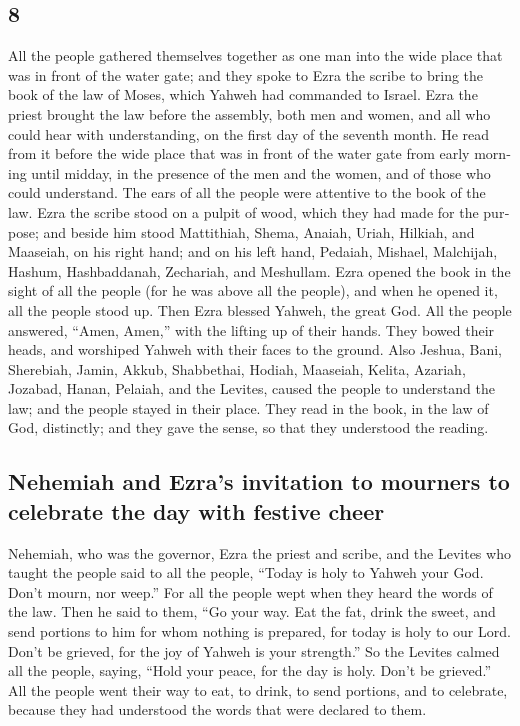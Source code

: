 \begin{paracol}{2}
\begin{otherlanguage}{english}
\hypertarget{section-15}{%
\section{8}\label{section-15}}

 All the people gathered themselves together as one man
into the wide place that was in front of the water gate; and they spoke
to Ezra the scribe to bring the book of the law of Moses, which Yahweh
had commanded to Israel.  Ezra the priest brought the law
before the assembly, both men and women, and all who could hear with
understanding, on the first day of the seventh month.  He
read from it before the wide place that was in front of the water gate
from early morning until midday, in the presence of the men and the
women, and of those who could understand. The ears of all the people
were attentive to the book of the law.  Ezra the scribe
stood on a pulpit of wood, which they had made for the purpose; and
beside him stood Mattithiah, Shema, Anaiah, Uriah, Hilkiah, and
Maaseiah, on his right hand; and on his left hand, Pedaiah, Mishael,
Malchijah, Hashum, Hashbaddanah, Zechariah, and Meshullam.
 Ezra opened the book in the sight of all the people (for
he was above all the people), and when he opened it, all the people
stood up.  Then Ezra blessed Yahweh, the great God. All
the people answered, ``Amen, Amen,'' with the lifting up of their hands.
They bowed their heads, and worshiped Yahweh with their faces to the
ground.  Also Jeshua, Bani, Sherebiah, Jamin, Akkub,
Shabbethai, Hodiah, Maaseiah, Kelita, Azariah, Jozabad, Hanan, Pelaiah,
and the Levites, caused the people to understand the law; and the people
stayed in their place.  They read in the book, in the law
of God, distinctly; and they gave the sense, so that they understood the
reading.

\hypertarget{nehemiah-and-ezras-invitation-to-mourners-to-celebrate-the-day-with-festive-cheer}{%
\subsection{Nehemiah and Ezra's invitation to mourners to celebrate the
day with festive
cheer}\label{nehemiah-and-ezras-invitation-to-mourners-to-celebrate-the-day-with-festive-cheer}}

 Nehemiah, who was the governor, Ezra the priest and
scribe, and the Levites who taught the people said to all the people,
``Today is holy to Yahweh your God. Don't mourn, nor weep.'' For all the
people wept when they heard the words of the law.  Then
he said to them, ``Go your way. Eat the fat, drink the sweet, and send
portions to him for whom nothing is prepared, for today is holy to our
Lord. Don't be grieved, for the joy of Yahweh is your strength.''
 So the Levites calmed all the people, saying, ``Hold
your peace, for the day is holy. Don't be grieved.''  All
the people went their way to eat, to drink, to send portions, and to
celebrate, because they had understood the words that were declared to
them.


\end{otherlanguage}
\end{paracol}
